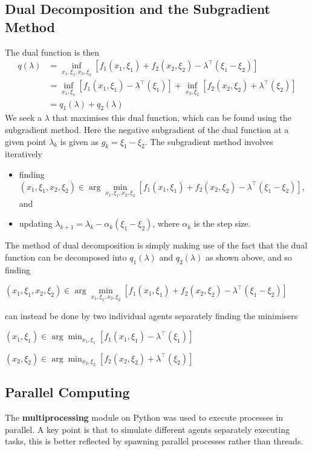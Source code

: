 \documentclass[12pt]{article}
\begin{document}
\subsection*{Dual Decomposition and the Subgradient Method}
The dual function is then
\begin{align*}
q(\lambda)&=\inf_{x_1,\xi_1,x_2,\xi_2}[f_1(x_1,\xi_1)+f_2(x_2,\xi_2)-\lambda^\top(\xi_1-\xi_2)]\\
&=\inf_{x_1,\xi_1}[f_1(x_1,\xi_1)-\lambda^\top(\xi_1)]+\inf_{x_2,\xi_2}[f_2(x_2,\xi_2)+\lambda^\top(\xi_2)]\\
&=q_1(\lambda)+q_2(\lambda)
\end{align*}
We seek a $\lambda$ that maximises this dual function, which can be found using the subgradient method. Here the negative subgradient of the dual function at a given point $\lambda_k$ is given as $g_k=\xi_1-\xi_2$. The subgradient method involves iteratively
\begin{itemize}
	\item finding $(x_1,\xi_1,x_2,\xi_2)\in\arg\min\limits_{x_1,\xi_1,x_2,\xi_2}[f_1(x_1,\xi_1)+f_2(x_2,\xi_2)-\lambda^\top(\xi_1-\xi_2)]$, and
	\item updating $\lambda_{k+1}=\lambda_k-\alpha_k(\xi_1-\xi_2)$, where $\alpha_k$ is the step size.
\end{itemize}

The method of dual decomposition is simply making use of the fact that the dual function can be decomposed into $q_1(\lambda)$ and $q_2(\lambda)$ as shown above, and so finding

$(x_1,\xi_1,x_2,\xi_2)\in\arg\min\limits_{x_1,\xi_1,x_2,\xi_2}[f_1(x_1,\xi_1)+f_2(x_2,\xi_2)-\lambda^\top(\xi_1-\xi_2)]$

\noindent can instead be done by two individual agents separately finding the minimisers

$(x_1,\xi_1)\in\arg\min_{x_1,\xi_1}[f_1(x_1,\xi_1)-\lambda^\top(\xi_1)]$

$(x_2,\xi_2)\in\arg\min_{x_2,\xi_2}[f_2(x_2,\xi_2)+\lambda^\top(\xi_2)]$

\subsection*{Parallel Computing}

The \textbf{multiprocessing} module on Python was used to execute processes in parallel. A key point is that to simulate different agents separately executing tasks, this is better reflected by spawning parallel processes rather than threads.
\end{document}
